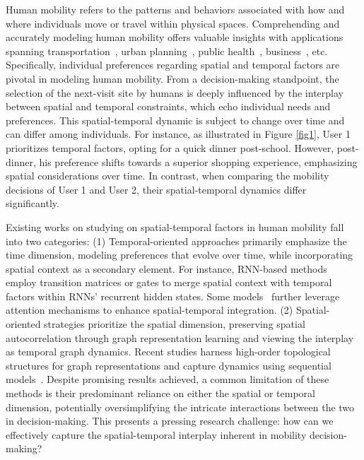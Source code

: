 \documentclass[letterpaper]{article} %
\begin{document}
Human mobility refers to the patterns and behaviors associated with how and where individuals move or travel within physical spaces. 
Comprehending and accurately modeling human mobility offers valuable insights with applications spanning transportation~\cite{wang2020incremental}, urban planning~\cite{wang2018learning,wang2020reimagining}, public health~\cite{qureshi2021equitable}, business~\cite{antoniou2012human}, etc.
Specifically, individual preferences regarding spatial and temporal factors are pivotal in modeling human mobility. 
From a decision-making standpoint, the selection of the next-visit site by humans is deeply influenced by the interplay between spatial and temporal constraints, which echo individual needs and preferences. 
This spatial-temporal dynamic is subject to change over time and can differ among individuals. 
For instance, as illustrated in Figure \ref{fig1}, User 1 prioritizes temporal factors, opting for a quick dinner post-school. 
However, post-dinner, his preference shifts towards a superior shopping experience, emphasizing spatial considerations over time. 
In contrast, when comparing the mobility decisions of User 1 and User 2, their spatial-temporal dynamics differ significantly.

%
Existing works on studying on spatial-temporal factors in human mobility fall into two categories: 
(1) Temporal-oriented approaches primarily emphasize the time dimension, modeling preferences that evolve over time, while incorporating spatial context as a secondary element. 
For instance, RNN-based methods~\cite{DBLP:conf/www/WangYCHWZH20,zhao2020go} employ transition matrices or gates to merge spatial context with temporal factors within RNNs' recurrent hidden states. 
Some models~\cite{lian2020geography,DBLP:conf/www/LuoLL21} further leverage attention mechanisms to enhance spatial-temporal integration. 
(2) Spatial-oriented strategies prioritize the spatial dimension, preserving spatial autocorrelation through graph representation learning and viewing the interplay as temporal graph dynamics. 
Recent studies harness high-order topological structures for graph representations and capture dynamics using sequential models~\cite{wang2019adversarial,yang2019revisiting,wang2020exploiting,wang2022learning,wang2023reinforced}. 
Despite promising results achieved, a common limitation of these methods is their predominant reliance on either the spatial or temporal dimension, potentially oversimplifying the intricate interactions between the two in decision-making.
This presents a pressing research challenge: how can we effectively capture the spatial-temporal interplay inherent in mobility decision-making?
\end{document}
